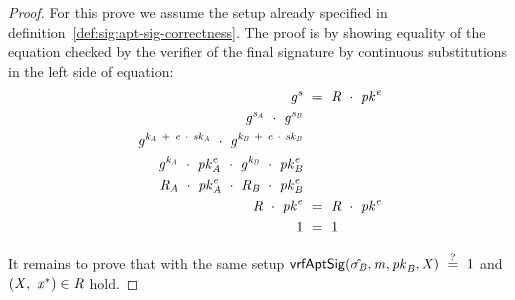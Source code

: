 \begin{proof}
    \label{prf:apt-schnorr-pre-sig-corr}
    For this prove we assume the setup already specified in definition~\ref{def:sig:apt-sig-correctness}.
    The proof is by showing equality of the equation checked by the verifier of the final signature by continuous substitutions in the left side of equation:
    \begin{align}
        \mathit{g}^{\mathit{s}} &~=~ \mathit{R} ~\cdot~ \mathit{pk}^{\mathit{e}} \\
        \mathit{g}^{\mathit{s}_{\mathit{A}}} ~\cdot~ \mathit{g}^{\mathit{s}_{\mathit{B}}} & \\
        \mathit{g}^{\mathit{\mathit{k}_{\mathit{A}}} ~+~ \mathit{e} ~\cdot~ \mathit{sk}_{\mathit{A}}} ~\cdot~ \mathit{g}^{\mathit{\mathit{k}_{\mathit{B}}} ~+~ \mathit{e} ~\cdot~ \mathit{sk}_{\mathit{B}}} & \\
        \mathit{g}^{\mathit{\mathit{k}_{\mathit{A}}}} ~\cdot~ \mathit{pk}_{\mathit{A}}^{\mathit{e}} ~\cdot~ \mathit{g}^{\mathit{\mathit{k}_{\mathit{B}}}} ~\cdot~ \mathit{pk}_{\mathit{B}}^{\mathit{e}} & \\
        \mathit{R}_{\mathit{A}} ~\cdot~ \mathit{pk}_{\mathit{A}}^{\mathit{e}} ~\cdot~ \mathit{R}_{\mathit{B}} ~\cdot~ \mathit{pk}_{\mathit{B}}^{\mathit{e}} & \\
        \mathit{R} ~\cdot~ \mathit{pk}^{\mathit{e}} & ~=~ \mathit{R} ~\cdot~ \mathit{pk}^{\mathit{e}} \\
        1 & ~=~ 1
    \end{align}

    It remains to prove that with the same setup $\mathsf{vrfAptSig}(\hat{\sigma_{\mathit{B}}},\mathit{m},\mathit{pk}_{\mathit{B}},\mathit{X}) ~\stackrel{?}{=}~ 1$ and
    $(\mathit{X} ,~ \mathit{x}^*) \in \mathit{R}$ hold.


\end{proof}
